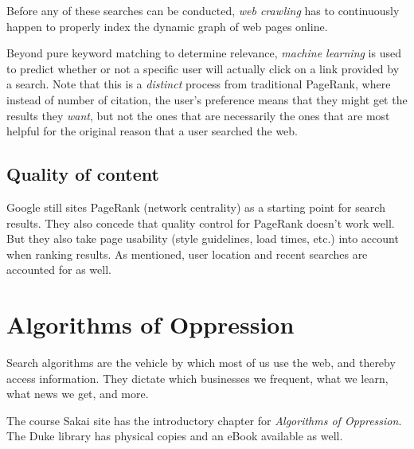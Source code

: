 \documentclass[titlepage, 12pt, leqno]{article}
\begin{document}
Before any of these searches can be conducted, \textit{web crawling} has to
continuously happen to properly index the dynamic graph of web pages online.

Beyond pure keyword matching to determine relevance, \textit{machine learning} is
used to predict whether or not a specific user will actually click on a link 
provided by a search. Note that this is a \textit{distinct} process from 
traditional PageRank, where instead of number of citation, the user's preference
means that they might get the results they \textit{want}, but not the ones that
are necessarily the ones that are most helpful for the original reason that a 
user searched the web.

\subsection{Quality of content}
Google still sites PageRank (network centrality) as a starting point for search
results. They also concede that quality control for PageRank doesn't work well.
But they also take page usability (style guidelines, load times, etc.) into
account when ranking results. As mentioned, user location and recent searches are
accounted for as well.

\pagebreak
\section{Algorithms of Oppression}
Search algorithms are the vehicle by which most of us use the web, and thereby
access information. They dictate which businesses we frequent, what we learn, 
what news we get, and more.

\begin{note}
    The course Sakai site has the introductory chapter for \textit{Algorithms of
    Oppression}. The Duke library has physical copies and an eBook available as
    well.
\end{note}
\end{document}
